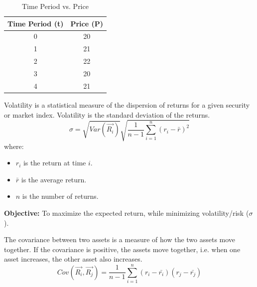\begin{table}[h!]
    \centering
    \begin{tabular}{|c|c|}
        \hline
        \textbf{Time Period (t)} & \textbf{Price (P)} \\ \hline
        0                        & 20                 \\ \hline
        1                        & 21                 \\ \hline
        2                        & 22                 \\ \hline
        3                        & 20                 \\ \hline
        4                        & 21                 \\ \hline
    \end{tabular}
    \caption{Time Period vs. Price}
    \label{tab:time_period_price}
\end{table}

\begin{definition}
    [Volatility]
    Volatility is a statistical measure of the dispersion of returns for a given security or market index.
    Volatility is the standard deviation of the returns.
    \begin{equation}
        \sigma = \sqrt{Var(\overrightarrow{R_i})}\sqrt{\frac{1}{n-1} \sum_{i=1}^{n} (r_i - \bar{r})^2}
    \end{equation}
    where:
    \begin{itemize}
        \item $r_i$ is the return at time $i$.
        \item $\bar{r}$ is the average return.
        \item $n$ is the number of returns.
    \end{itemize}
\end{definition}

\begin{proposition}
    \textbf{Objective:} To maximize the expected return, while minimizing volatility/risk ($\sigma$).\\
\end{proposition}
\begin{definition}
    [Covariance]
    The covariance between two assets is a measure of how the two assets move together. If the covariance is positive, the assets move together, i.e. when one asset increases, the other asset also increases.
    \begin{equation}
        Cov(\overrightarrow{R_i},\overrightarrow{R_j}) = \frac{1}{n-1} \sum_{i=1}^{n} (r_{i} - \bar{r_i})(r_{j} - \bar{r_j})
    \end{equation}
\end{definition}

